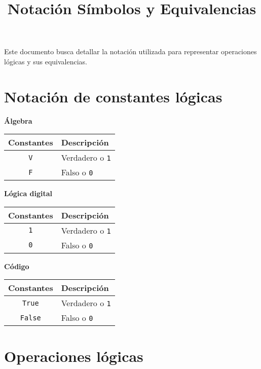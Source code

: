 \documentclass[a4paper,10pt]{article}
\title{\vspace{-13mm}Notación Símbolos y Equivalencias}
\date{}
\begin{document}
\maketitle

Este documento busca detallar la notación utilizada para representar operaciones lógicas y sus equivalencias.

\section*{Notación de constantes lógicas}

\begin{multicols}{3}
    \begin{center}
    \textbf{Álgebra}\\
    \begin{tabular}{c|p{2.15cm}}
    \small Constantes & \small Descripción\\
    \hline
    \verb|V|  & \small Verdadero o \verb|1|\\
    \verb|F|  & \small Falso o \verb|0|\\
    \end{tabular}
    \end{center}
\columnbreak
    \begin{center}
    \textbf{Lógica digital}\\
    \begin{tabular}{c|p{2.15cm}}
    \small Constantes & \small Descripción\\
    \hline
    \verb|1|              & \small Verdadero o \verb|1|\\
    \verb|0|              & \small Falso o \verb|0|\\
    \end{tabular}
    \end{center}
\columnbreak
    \begin{center}
    \textbf{Código}\\
    \begin{tabular}{c|p{2.15cm}}
    \small Constantes & \small Descripción\\
    \hline
    \verb|True|   & \small Verdadero o \verb|1|\\
    \verb|False|  & \small Falso o \verb|0|\\
    \end{tabular}
    \end{center}
\end{multicols}
    
\section*{Operaciones lógicas}
\end{document}
